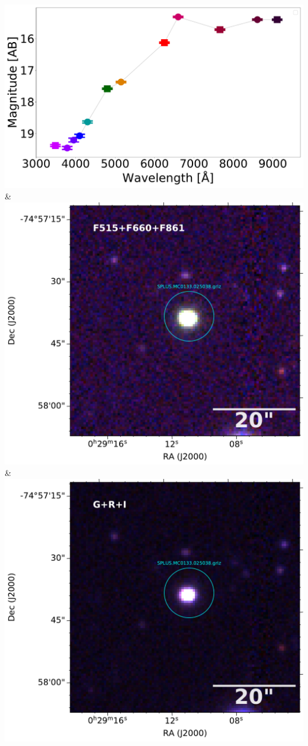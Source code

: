 \includegraphics[width=0.3\linewidth, clip]{photopectrum_splus_MC0133-025038_pne-smc-splus-match-2007_aper.pdf} & \includegraphics[width=0.3\linewidth, clip]{MC0133/MC0133_F861_025038-RGB.pdf} & \includegraphics[width=0.3\linewidth, clip]{MC0133/MC0133_I_025038-RGB.pdf} \\
